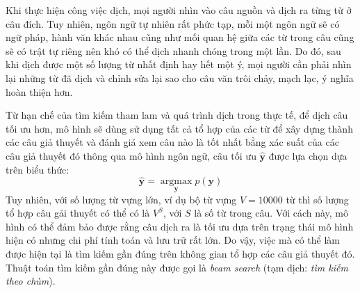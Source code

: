 Khi thực hiện công việc dịch, mọi người nhìn vào câu nguồn và dịch ra từng từ ở câu đích. Tuy nhiên, ngôn ngữ tự nhiên rất phức tạp, mỗi một ngôn ngữ sẽ có ngữ pháp, hành văn khác nhau cũng như mối quan hệ giữa các từ trong câu cũng sẽ có trật tự riêng nên khó có thể dịch nhanh chóng trong một lần. Do đó, sau khi dịch được một số lượng từ nhất định hay hết một ý, mọi người cần phải nhìn lại những từ đã dịch và chỉnh sửa lại sao cho câu văn trôi chảy, mạch lạc, ý nghĩa hoàn thiện hơn.

Từ hạn chế của tìm kiếm tham lam và quá trình dịch trong thực tế, để dịch câu tối ưu hơn, mô hình sẽ dùng sử dụng tất cả tổ hợp của các từ để xây dựng thành các câu giả thuyết và đánh giá xem câu nào là tốt nhất bằng xác suất của các câu giả thuyết đó thông qua mô hình ngôn ngữ, câu tối ưu $\bm{\hat{y}}$ được lựa chọn dựa trên biểu thức:
\begin{equation*}
\bm{\hat{y}} = \operatorname*{argmax}_{\bm{y}} p(\bm{y})
\end{equation*}
Tuy nhiên, với số lượng từ vựng lớn, ví dụ bộ từ vựng $V = 10000$ từ thì số lượng tổ hợp câu gải thuyết có thể có là $V^S$, với $S$ là số từ trong câu. Với cách này, mô hình có thể đảm bảo được rằng câu dịch ra là tối ưu dựa trên trạng thái mô hình hiện có nhưng chi phí tính toán và lưu trữ rất lớn. Do vậy, việc mà có thể làm được hiện tại là tìm kiếm gần đúng trên không gian tổ hợp các câu giả thuyết đó. Thuật toán tìm kiếm gần đúng này được gọi là \textit{beam search} (tạm dịch: \textit{tìm kiếm theo chùm}).

